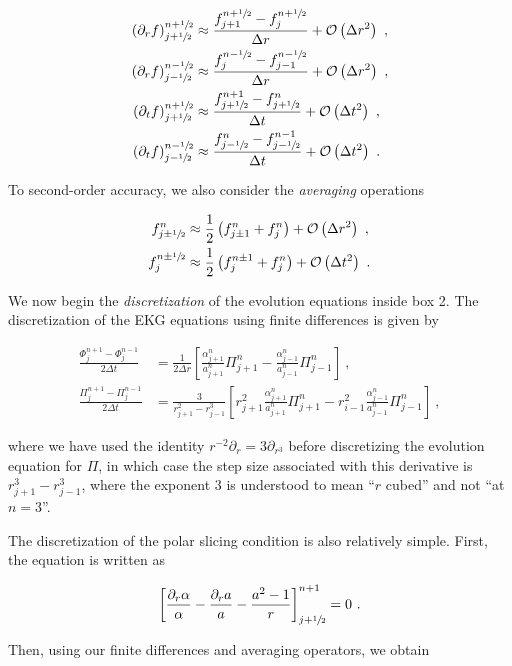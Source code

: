 \documentclass[a4paper,11pt]{article}
\renewcommand{\a}{\alpha}
\newcommand{\pd}{\partial}
\newcommand{\dt}{\Delta t}
\newcommand{\dr}{\Delta r}
\newcommand{\order}[2]{\mathcal{O}\lrpar{#1^{#2}}}
\newcommand{\lrpar}[1]{\left( #1 \right)}
\newcommand{\lrsquare}[1]{\left[ #1 \right]}
\newcommand{\n}{\noindent}
\newcommand{\eq}[1]{
  \begin{equation}
    #1
  \end{equation}
}
\newcommand{\spl}[1]{
  \begin{split}
    #1
  \end{split}
}
\newcommand{\al}[1]{
  \begin{align}
    #1
  \end{align}
}
\begin{document}
\eq{
  \spl{
    \lrpar{\pd_{r}f}^{n+\sfrac{1}{2}}_{j+\sfrac{1}{2}} &\approx \frac{f^{n+\sfrac{1}{2}}_{j+1} - f^{n+\sfrac{1}{2}}_{j}}{\dr} + \order{\dr}{2}\ ,\\
    \lrpar{\pd_{r}f}^{n-\sfrac{1}{2}}_{j-\sfrac{1}{2}} &\approx \frac{f^{n-\sfrac{1}{2}}_{j} - f^{n-\sfrac{1}{2}}_{j-1}}{\dr} + \order{\dr}{2}\ ,\\
    \lrpar{\pd_{t}f}^{n+\sfrac{1}{2}}_{j+\sfrac{1}{2}} &\approx \frac{f^{n+1}_{j+\sfrac{1}{2}} - f^{n}_{j+\sfrac{1}{2}}}{\dt} + \order{\dt}{2}\ ,\\
    \lrpar{\pd_{t}f}^{n-\sfrac{1}{2}}_{j-\sfrac{1}{2}} &\approx \frac{f^{n}_{j-\sfrac{1}{2}} - f^{n-1}_{j-\sfrac{1}{2}}}{\dt} + \order{\dt}{2}\ .
  }
}

To second-order accuracy, we also consider the \emph{averaging} operations

\eq{
  \spl{
    f^{n}_{j\pm\sfrac{1}{2}} &\approx \frac{1}{2}\lrpar{f^{n}_{j\pm1} + f^{n}_{j}} + \order{\dr}{2}\ ,\\
    f^{n\pm\sfrac{1}{2}}_{j} &\approx \frac{1}{2}\lrpar{f^{n\pm1}_{j} + f^{n}_{j}} + \order{\dt}{2}\ .
  }
}

We now begin the \emph{discretization} of the evolution equations inside box 2. The discretization of the EKG equations using finite differences is given by

\al{
  \frac{\Phi^{n+1}_{j} - \Phi^{n-1}_{j}}{2\dt} &= \frac{1}{2\dr}\lrsquare{\frac{\a^{n}_{j+1}}{a^{n}_{j+1}}\Pi^{n}_{j+1} - \frac{\a^{n}_{j-1}}{a^{n}_{j-1}}\Pi^{n}_{j-1}}\ ,\\
  \frac{\Pi^{n+1}_{j}  - \Pi^{n-1}_{j}}{2\dt}  &= \frac{3}{r_{j+1}^{2} - r_{j-1}^{3}}\lrsquare{r^{2}_{j+1}\frac{\a^{n}_{j+1}}{a^{n}_{j+1}}\Pi^{n}_{j+1} - r^{2}_{i-1}\frac{\a^{n}_{j-1}}{a^{n}_{j-1}}\Pi^{n}_{j-1}}\ ,
}

\noindent where we have used the identity $r^{-2}\pd_{r} = 3\pd_{r^{3}}$ before discretizing the evolution equation for $\Pi$, in which case the step size associated with this derivative is $r^{3}_{j+1} - r^{3}_{j-1}$, where the exponent $3$ is understood to mean ``$r$ cubed'' and not ``at $n=3$''.

The discretization of the polar slicing condition is also relatively simple. First, the equation is written as

\eq{ \lrsquare{\frac{\pd_{r}\a}{\a} - \frac{\pd_{r}a}{a} - \frac{a^{2}-1}{r}}^{n+1}_{j+\sfrac{1}{2}} = 0\ .}

\n Then, using our finite differences and averaging operators, we obtain
\end{document}
